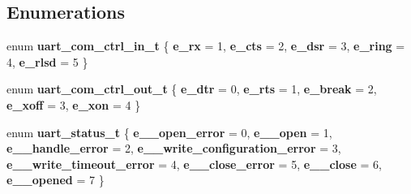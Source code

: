 \subsection*{Enumerations}
\begin{DoxyCompactItemize}
\item 
enum \textbf{ uart\+\_\+com\+\_\+ctrl\+\_\+in\+\_\+t} \{ \newline
{\bfseries e\+\_\+rx} = 1, 
{\bfseries e\+\_\+cts} = 2, 
{\bfseries e\+\_\+dsr} = 3, 
{\bfseries e\+\_\+ring} = 4, 
\newline
{\bfseries e\+\_\+rlsd} = 5
 \}
\item 
\mbox{\label{group___u_a_r_t_ga780849ccdce6e933c3adff0ed074aafa}} 
enum {\bfseries uart\+\_\+com\+\_\+ctrl\+\_\+out\+\_\+t} \{ \newline
{\bfseries e\+\_\+dtr} = 0, 
{\bfseries e\+\_\+rts} = 1, 
{\bfseries e\+\_\+break} = 2, 
{\bfseries e\+\_\+xoff} = 3, 
\newline
{\bfseries e\+\_\+xon} = 4
 \}
\item 
\mbox{\label{group___u_a_r_t_gaf7d6a356f1601c95992ab6990320fd35}} 
enum {\bfseries uart\+\_\+status\+\_\+t} \{ \newline
{\bfseries e\+\_\+\_\+open\+\_\+error} = 0, 
{\bfseries e\+\_\+\_\+open} = 1, 
{\bfseries e\+\_\+\_\+handle\+\_\+error} = 2, 
{\bfseries e\+\_\+\_\+write\+\_\+configuration\+\_\+error} = 3, 
\newline
{\bfseries e\+\_\+\_\+write\+\_\+timeout\+\_\+error} = 4, 
{\bfseries e\+\_\+\_\+close\+\_\+error} = 5, 
{\bfseries e\+\_\+\_\+close} = 6, 
{\bfseries e\+\_\+\_\+opened} = 7
 \}
\end{DoxyCompactItemize}
